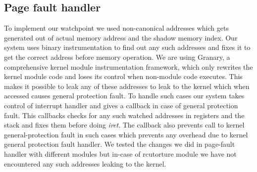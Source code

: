 \subsection{Page fault handler}
To implement our watchpoint we used non-canonical addresses which gets generated out of actual memory address and the shadow memory index. Our system uses binary instrumentation to find out any such addresses and fixes it to get the correct address before memory operation. We are using Granary, a comprehensive kernel module instrumentation framework, which only rewrites the kernel module code and loses its control when non-module code executes. This makes it possible to leak any of these addresses to leak to the kernel which when accessed causes general protection fault. To handle such cases our system takes control of interrupt handler and gives a callback in case of general protection fault. This callbacks checks for any such watched addresses in registers and the stack and fixes them before doing \emph{iret}. The callback also prevents call to kernel general-protection fault in such cases which prevents any overhead due to kernel general protection fault handler. We tested the changes we did in page-fault handler with different modules but in-case of rcutorture module we have not encountered any such addresses leaking to the kernel.

